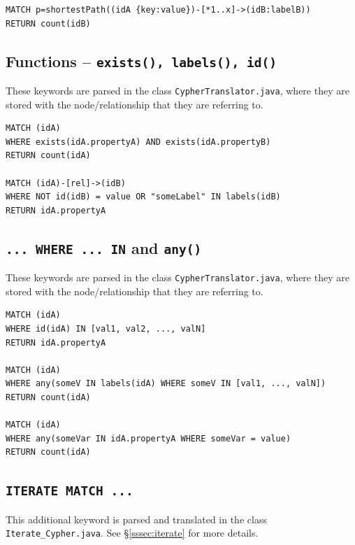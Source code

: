\documentclass[letterpaper]{ltxdoc}
\begin{document}
\medskip

\begin{lstlisting}[language = Cypher]
MATCH p=shortestPath((idA {key:value})-[*1..x]->(idB:labelB))
RETURN count(idB)
\end{lstlisting}

\subsection*{Functions -- \texttt{exists(), labels(), id()}}
These keywords are parsed in the class \texttt{CypherTranslator.java}, where they are stored with the node/relationship that they are referring to.

\medskip

\begin{lstlisting}[language = Cypher]
MATCH (idA)
WHERE exists(idA.propertyA) AND exists(idA.propertyB)
RETURN count(idA)

MATCH (idA)-[rel]->(idB)
WHERE NOT id(idB) = value OR "someLabel" IN labels(idB)
RETURN idA.propertyA
\end{lstlisting}

\newpage

\subsection*{\texttt{... WHERE ... IN} and \texttt{any()}}
These keywords are parsed in the class \texttt{CypherTranslator.java}, where they are stored with the node/relationship that they are referring to.

\medskip

\begin{lstlisting}[language = Cypher]
MATCH (idA)
WHERE id(idA) IN [val1, val2, ..., valN]
RETURN idA.propertyA

MATCH (idA)
WHERE any(someV IN labels(idA) WHERE someV IN [val1, ..., valN])
RETURN count(idA)

MATCH (idA)
WHERE any(someVar IN idA.propertyA WHERE someVar = value)
RETURN count(idA)
\end{lstlisting}

\subsection*{\texttt{ITERATE MATCH ...}}
This additional keyword is parsed and translated in the class \texttt{Iterate\_Cypher.java}. See \S \ref{sssec:iterate} for more details.

\medskip
\end{document}
